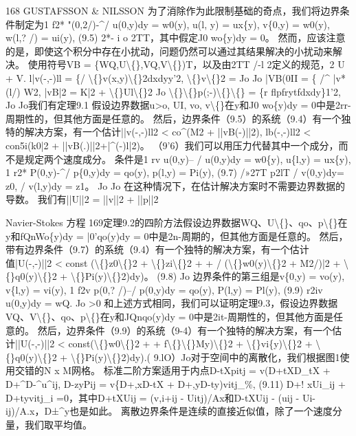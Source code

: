 \documentclass[UTF8,11pt,a4paper,openany,fontset=fandol]{ctexbook}
\begin{document}
168 GUSTAFSSON \& NILSSON 为了消除作为此限制基础的奇点，我们将边界条件制定为1 f2* "(0,2/)-\textasciicircum{}/ u(0,y)dy = w0(y), u(l, y) = ux\{y), v\{0,y) = w0(y), w(l,? /) = ui(y), (9.5) 2*- i o 2TT，其中假定J0 wo\{y)dy = 0。 然而，应该注意的是，即使这个积分中存在小扰动，问题仍然可以通过其结果解决的小扰动来解决。 使用符号VB = \{WQ,U\textbackslash\{\},VQ,V\textbackslash\{\})T，以及由2TT /-l 2定义的规范，2 U + V. l|v(-,-)ll = \{/ \textbackslash\{\}v(x,y)\textbackslash\{\}2dxdyy'2, \textbackslash\{\}v\textbackslash\{\}2 = Jo Jo |VB(0II = \{ /\textasciicircum{} |v*(l/) W2, |vB|2 = K|2 + \textbackslash\{\}Ul\textbackslash\{\}2 Jo \textbackslash\{\}\textbackslash\{\}p(;-)\textbackslash\{\}\textbackslash\{\} = \{r flpfrytfdxdy\}1'2, Jo Jo我们有定理9.1 假设边界数据u>o, UI, vo, v\textbackslash\{\}在y和J0 wo\{y)dy = 0中是2rr-周期性的，但其他方面是任意的。 然后，边界条件（9.5）的系统（9.4）有一个独特的解决方案，有一个估计||v(-,-)ll2 < co\textasciicircum{}(M2 + ||vB(-)||2), lb(-,-)ll2 < con5i(k0|2 + ||vB(.)||2+|\textasciicircum{}(-)l|2)。 （9'6）我们可以用压力代替其中一个成分，而不是规定两个速度成分。 条件是1 rv u(0,y)-- / u(0,y)dy = w0\{y), u\{l,y) = ux\{y), 1 r2* P(0,y)-\textasciicircum{}/ p\{0,y)dy = qo(y), p(l,y) = Pi(y), (9.7) /»27T p2lT / v(0,y)dy= z0, / v(l,y)dy = z1。 Jo Jo 在这种情况下，在估计解决方案时不需要边界数据的导数。 我们有||U||2 = ||v||2 + ||p||2

Navier-Stokes 方程 169定理9.2的四阶方法假设边界数据WQ、U\textbackslash\{\}、qo、p\textbackslash\{\}在y和fQnWo\{y)dy = |0'qo(y)dy = 0中是2n-周期的，但其他方面是任意的。 然后，带有边界条件（9.7）的系统（9.4）有一个独特的解决方案，有一个估计值|U(-,-)||2 < const (\textbackslash\{\}z0\textbackslash\{\}2 + \textbackslash\{\}zi\textbackslash\{\}2 + + / (\textbackslash\{\}w0(y)\textbackslash\{\}2 + M2/)|2 + \textbackslash\{\}q0(y)\textbackslash\{\}2 + \textbackslash\{\}Pi(y)\textbackslash\{\}2)dy)。 (9.8) Jo 边界条件的第三组是v\{0,y) = vo(y), v\{l,y) = vi(y), 1 f2v p(0,? /)--/ p(0,y)dy = qo(y), P(l,y) = Pl(y), (9.9) r2iv u(0,y)dy = wQ. Jo >0 和上述方式相同，我们可以证明定理9.3，假设边界数据VQ、V\textbackslash\{\}、qo、p\textbackslash\{\}在y和JQnqo(y)dy = 0中是2it-周期性的，但其他方面是任意的。 然后，边界条件（9.9）的系统（9-4）有一个独特的解决方案，有一个估计||U(-,-)||2 < const(\textbackslash\{\}w0\textbackslash\{\}2 + + f\textbackslash\{\}\textbackslash\{\}My)\textbackslash\{\}2 + \textbackslash\{\}vi\{y)\textbackslash\{\}2 + \textbackslash\{\}q0(y)\textbackslash\{\}2 + \textbackslash\{\}Pi(y)\textbackslash\{\}2)dy).( 9.lO）Jo对于空间中的离散化，我们根据图1使用交错的N x M网格。 标准二阶方案适用于内点D-tXpitj = v(D+tXD\_tX + D+\textasciicircum{}D-\textasciicircum{}u\textasciicircum{}ij, D-zyPij = v\{D+,xD-tX + D+,yD-ty)vitj\_\%, (9.11) D+! xUi\_ij + D+tyvitj\_i =0，其中D+tXUij = (v,i+ij - Uitj)/Ax和D-tXUij - (uij - Ui-ij)/A.x，D±\textasciicircum{}y也是如此。 离散边界条件是连续的直接近似值，除了一个速度分量，我们取平均值。
\end{document}
